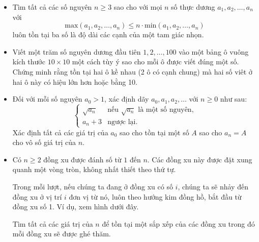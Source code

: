 \documentclass[11pt]{scrartcl}
\begin{document}
\begin{itemize}[label=, leftmargin=0em, itemsep=-0em]
    \item \begin{btvn}
    Tìm tất cả các số nguyên $n \geq 3$ sao cho với mọi $n$ số thực dương $a_1, a_2, \hdots, a_n$ với 
    \[\text{max}(a_1,a_2,\hdots,a_n) \leq n \cdot \text{min}(a_1,a_2,\hdots,a_n)\]
    luôn tồn tại ba số là độ dài các cạnh của một tam giác nhọn.
    \end{btvn}
    
    \item \begin{btvn}
        Viết một trăm số nguyên dương đầu tiên $1,2,\dots,100$ vào một bảng ô vuông kích thước $10\times 10$ một cách tùy ý sao cho mỗi ô được viết đúng một số. Chứng minh rằng tồn tại hai ô kề nhau (2 ô có cạnh chung) mà hai số viêt ở hai ô này có hiệu lớn hơn hoặc bằng 10.
    \end{btvn}
    \item \begin{btvn}
        Đối với mỗi số nguyên $a_0 > 1$, xác định dãy $a_0, a_1, a_2, \ldots$ với $n \geq 0$ như sau:
        $$
        \begin{cases}
        \sqrt{a_n} & \text{nếu } \sqrt{a_n} \text{ là một số nguyên,} \\
        a_n + 3 & \text{ngược lại.}
        \end{cases}
        $$
    Xác định tất cả các giá trị của $a_0$ sao cho tồn tại một số $A$ sao cho $a_n = A$ cho vô số giá trị của $n$.
    \end{btvn}

    \item \begin{btvn}
    Có $n \geq 2$ đồng xu được đánh số từ $1$ đến $n$. Các đồng xu này được đặt xung quanh một vòng tròn, không nhất thiết theo thứ tự.
    
    Trong mỗi lượt, nếu chúng ta đang ở đồng xu có số $i$, chúng ta sẽ nhảy đến đồng xu ở vị trí $i$ đơn vị từ nó, luôn theo hướng kim đồng hồ, bắt đầu từ đồng xu số 1. Ví dụ, xem hình dưới đây.
    
    Tìm tất cả các giá trị của $n$ để tồn tại một sắp xếp của các đồng xu trong đó mỗi đồng xu sẽ được ghé thăm.
    \end{btvn}


\end{itemize}
\end{document}

